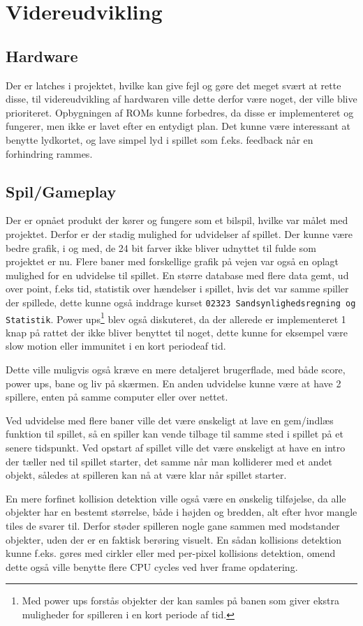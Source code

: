 \section{Videreudvikling}
\subsection{Hardware}
Der er latches i projektet, hvilke kan give fejl og gøre det meget svært at rette disse, til videreudvikling af hardwaren ville dette derfor være noget, der ville blive prioriteret. Opbygningen af ROMs kunne forbedres, da disse er implementeret og fungerer, men ikke er lavet efter en entydigt plan. Det kunne være interessant at benytte lydkortet, og lave simpel lyd i spillet som f.eks. feedback når en forhindring rammes.

\subsection{Spil/Gameplay}
Der er opnået produkt der kører og fungere som et bilspil, hvilke var målet med projektet. Derfor er der stadig mulighed for udvidelser af spillet.
Der kunne være bedre grafik, i og med, de 24 bit farver ikke bliver udnyttet til fulde som projektet er nu.
Flere baner med forskellige grafik på vejen var også en oplagt mulighed for en udvidelse til spillet.
En større database med flere data gemt, ud over point, f.eks tid, statistik over hændelser i spillet, hvis det var samme spiller der spillede, dette kunne også inddrage kurset \texttt{02323 Sandsynlighedsregning og Statistik}.
Power ups\footnote{Med power ups forstås objekter der kan samles på banen som giver ekstra muligheder for spilleren i en kort periode af tid.} blev også diskuteret, da der allerede er implementeret 1 knap på rattet der ikke bliver benyttet til noget, dette kunne for eksempel være slow motion eller immunitet i en kort periodeaf tid.

Dette ville muligvis også kræve en mere detaljeret brugerflade, med både score, power ups, bane og liv på skærmen. En anden udvidelse kunne være at have 2 spillere, enten på samme computer eller over nettet.

Ved udvidelse med flere baner ville det være ønskeligt at lave en gem/indlæs funktion til spillet, så en spiller kan vende tilbage til samme sted i spillet på et senere tidspunkt. Ved opstart af spillet ville det være ønskeligt at have en intro der tæller ned til spillet starter, det samme når man kolliderer med et andet objekt, således at spilleren kan nå at være klar når spillet starter.

En mere forfinet kollision detektion ville også være en ønskelig tilføjelse, da alle objekter har en bestemt størrelse, både i højden og bredden, alt efter hvor mangle tiles de svarer til. Derfor støder spilleren nogle gane sammen med modstander objekter, uden der er en faktisk berøring visuelt. En sådan kollisions detektion kunne f.eks. gøres med cirkler eller med per-pixel kollisions detektion, omend dette også ville benytte flere CPU cycles ved hver frame opdatering.